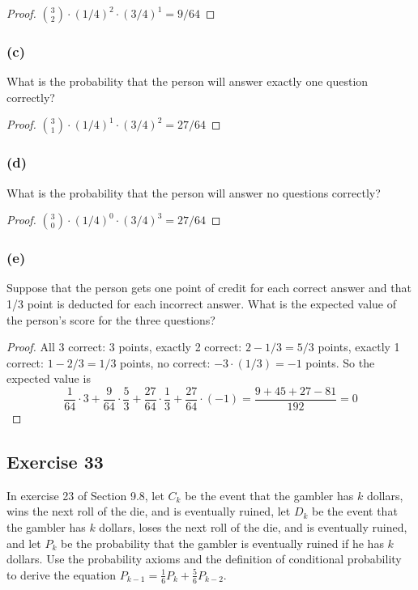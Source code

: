 \documentclass[14pt]{extarticle}
\newcommand{\dps}{\displaystyle}
\begin{document}
\begin{proof}
\(\binom{3}{2} \cdot (1/4)^2 \cdot (3/4)^1 = 9/64\)
\end{proof}

\subsubsection{(c)}
What is the probability that the person will answer exactly one question correctly?

\begin{proof}
\(\binom{3}{1} \cdot (1/4)^1 \cdot (3/4)^2 = 27/64\)
\end{proof}

\subsubsection{(d)}
What is the probability that the person will answer no questions correctly?

\begin{proof}
\(\dps \binom{3}{0} \cdot (1/4)^0 \cdot (3/4)^3 = 27/64\)
\end{proof}

\subsubsection{(e)}
Suppose that the person gets one point of credit for each correct answer and that 1/3 point is deducted for each 
incorrect answer. What is the expected value of the person’s score for the three questions?

\begin{proof}
All 3 correct: 3 points, exactly 2 correct: \(2-1/3 = 5/3\) points, exactly 1 correct: \(1 - 2/3 = 1/3\) points, no 
correct: \(-3 \cdot (1/3) = -1\) points. So the expected value is
\[
\frac{1}{64} \cdot 3 + \frac{9}{64} \cdot \frac{5}{3} + \frac{27}{64} \cdot \frac{1}{3} + \frac{27}{64} \cdot (-1) =
\frac{9 + 45 + 27 - 81}{192} = 0
\]
\end{proof}

\subsection{Exercise 33}
In exercise 23 of Section 9.8, let \(C_k\) be the event that the gambler has \(k\) dollars, wins the next roll of the die, 
and is eventually ruined, let \(D_k\) be the event that the gambler has \(k\) dollars, loses the next roll of the die, and 
is eventually ruined, and let \(P_k\) be the probability that the gambler is eventually ruined if he has \(k\) dollars. Use 
the probability axioms and the definition of conditional probability to derive the equation 
\(P_{k-1} = \frac{1}{6}P_k + \frac{5}{6}P_{k-2}\).
\end{document}
